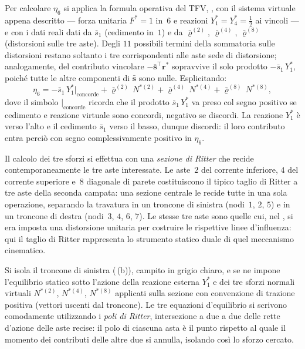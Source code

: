 \begin{esempio}
\begin{svolgimento}
		Per calcolare $\eta_6$ si applica la formula operativa del TFV,
		, con il sistema virtuale appena
		descritto --- forza unitaria $F^{*}=1$ in~$6$ e reazioni
		$Y_1^{*}=Y_4^{*}=\tfrac{1}{2}$ ai vincoli --- e con i dati reali
		dati da $\bar s_1$ (cedimento in~$1$) e da $\bar\varrho^{(2)}$,
		$\bar\varrho^{(4)}$, $\bar\varrho^{(8)}$ (distorsioni sulle tre
		aste). Degli $11$ possibili termini della sommatoria sulle
		distorsioni restano soltanto i tre corrispondenti alle aste sede
		di distorsione; analogamente, del contributo vincolare
		$-\bar{\bm{s}}^\top\bm{r}^{*}$ sopravvive il solo prodotto
		$-\bar s_1\,Y_1^{*}$, poiché tutte le altre componenti di
		$\bar{\bm{s}}$ sono nulle. Esplicitando:
		\begin{equation*}
			\eta_6 = -\bar s_1\,Y_1^{*}\big|_{\text{concorde}}
			+ \bar\varrho^{(2)}\,N^{*(2)}
			+ \bar\varrho^{(4)}\,N^{*(4)}
			+ \bar\varrho^{(8)}\,N^{*(8)},
		\end{equation*}
		dove il simbolo $\big|_{\text{concorde}}$ ricorda che il prodotto
		$\bar s_1\,Y_1^{*}$ va preso col segno positivo se cedimento e
		reazione virtuale sono concordi, negativo se discordi. La reazione
		$Y_1^{*}$ è verso l'alto e il cedimento $\bar s_1$ verso il basso,
		dunque discordi: il loro contributo entra perciò con segno
		complessivamente positivo in $\eta_6$.
		
		
		Il calcolo dei tre sforzi si effettua con una \emph{sezione di
			Ritter} che recide contemporaneamente le tre aste interessate. Le
		aste~$2$ del corrente inferiore, $4$ del corrente superiore e~$8$
		diagonale di parete costituiscono il tipico taglio di Ritter a tre
		aste della seconda campata: una sezione centrale le recide tutte in
		una sola operazione, separando la travatura in un troncone di
		sinistra (nodi~$1$, $2$, $5$) e in un troncone di destra
		(nodi~$3$, $4$, $6$, $7$). Le stesse tre aste sono quelle cui, nel
		, si era imposta una distorsione
		unitaria per costruire le rispettive linee d'influenza: qui il
		taglio di Ritter rappresenta lo strumento statico duale di quel
		meccanismo cinematico.
		
		Si isola il troncone di sinistra
		(\,(b)), campito in grigio chiaro, e se
		ne impone l'equilibrio statico sotto l'azione della reazione
		esterna $Y_1^{*}$ e dei tre sforzi normali virtuali $N^{*(2)}$,
		$N^{*(4)}$, $N^{*(8)}$ applicati sulla sezione con convenzione di
		trazione positiva (vettori uscenti dal troncone). Le tre equazioni
		d'equilibrio si scrivono comodamente utilizzando i \emph{poli di
			Ritter}, intersezione a due a due delle rette d'azione delle aste
		recise: il polo di ciascuna asta è il punto rispetto al quale il
		momento dei contributi delle altre due si annulla, isolando così
		lo sforzo cercato.
		

\end{svolgimento}
\end{esempio}
